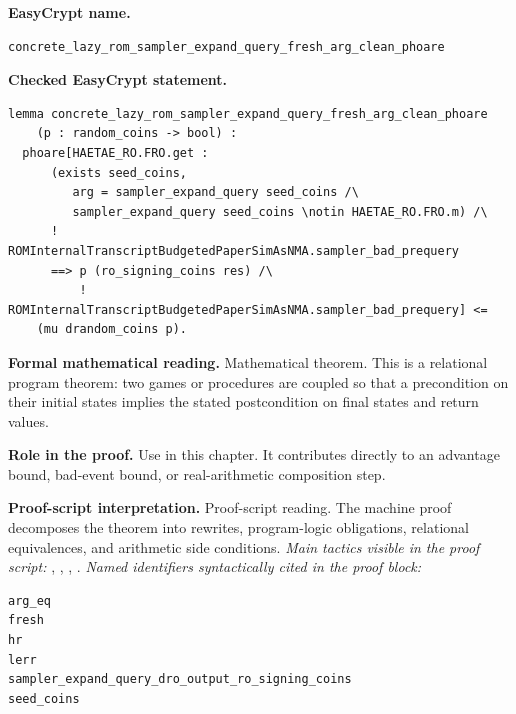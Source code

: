 \begin{formaltheorem}
\noindent\textbf{EasyCrypt name.}
\begin{lstlisting}[language=EasyCrypt,basicstyle=\ttfamily\scriptsize]
concrete_lazy_rom_sampler_expand_query_fresh_arg_clean_phoare
\end{lstlisting}
\noindent\textbf{Checked EasyCrypt statement.}
\begin{lstlisting}[language=EasyCrypt,basicstyle=\ttfamily\scriptsize]
lemma concrete_lazy_rom_sampler_expand_query_fresh_arg_clean_phoare
    (p : random_coins -> bool) :
  phoare[HAETAE_RO.FRO.get :
      (exists seed_coins,
         arg = sampler_expand_query seed_coins /\
         sampler_expand_query seed_coins \notin HAETAE_RO.FRO.m) /\
      ! ROMInternalTranscriptBudgetedPaperSimAsNMA.sampler_bad_prequery
      ==> p (ro_signing_coins res) /\
          ! ROMInternalTranscriptBudgetedPaperSimAsNMA.sampler_bad_prequery] <=
    (mu drandom_coins p).
\end{lstlisting}
\noindent\textbf{Formal mathematical reading.}
Mathematical theorem. This is a relational program theorem: two games or procedures are coupled so that a precondition on their initial states implies the stated postcondition on final states and return values.

\noindent\textbf{Role in the proof.}
Use in this chapter. It contributes directly to an advantage bound, bad-event bound, or real-arithmetic composition step.

\noindent\textbf{Proof-script interpretation.}
Proof-script reading. The machine proof decomposes the theorem into rewrites, program-logic obligations, relational equivalences, and arithmetic side conditions.
\emph{Main tactics visible in the proof script:} , , , .
\emph{Named identifiers syntactically cited in the proof block:}
\begin{lstlisting}[language=EasyCrypt,basicstyle=\ttfamily\scriptsize]
arg_eq
fresh
hr
lerr
sampler_expand_query_dro_output_ro_signing_coins
seed_coins
\end{lstlisting}

\end{formaltheorem}

